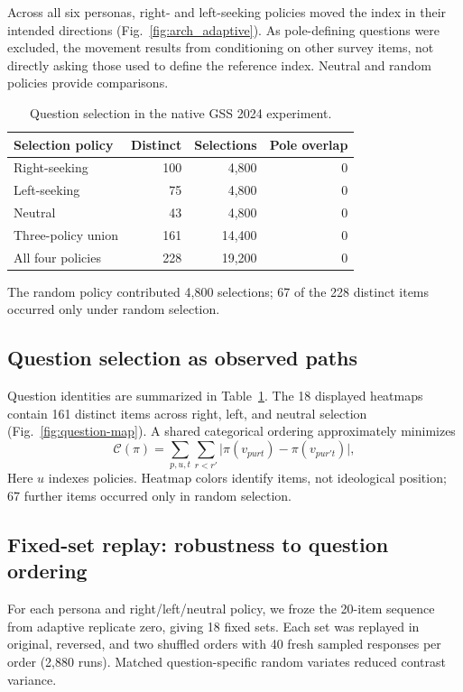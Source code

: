 \documentclass[technote,10pt]{IEEEtran}
\begin{document}
Across all six personas, right- and left-seeking policies moved the index in their intended directions (Fig.~\ref{fig:arch_adaptive}). As pole-defining questions were excluded, the movement results from conditioning on other survey items, not directly asking those used to define the reference index. Neutral and random policies provide comparisons.

\begin{table}[!t]
\centering
\caption{Question selection in the native GSS 2024 experiment.}
\label{tab:question-coverage}
\begingroup
\footnotesize
\setlength{\tabcolsep}{4pt}
\renewcommand{\arraystretch}{1.08}
\begin{tabular}{@{}lrrr@{}}
\toprule
\textbf{Selection policy} & \textbf{Distinct} & \textbf{Selections} & \textbf{Pole overlap}\\
\midrule
Right-seeking & 100 & 4,800 & 0\\
Left-seeking & 75 & 4,800 & 0\\
Neutral & 43 & 4,800 & 0\\
\midrule
Three-policy union & 161 & 14,400 & 0\\
All four policies & 228 & 19,200 & 0\\
\bottomrule
\end{tabular}
\endgroup
\par\smallskip
{\footnotesize\raggedright The random policy contributed 4,800 selections; 67 of the 228 distinct items occurred only under random selection.\par}
\end{table}

\subsection{Question selection as observed paths}
Question identities are summarized in Table~\ref{tab:question-coverage}. The 18 displayed heatmaps contain 161 distinct items across right, left, and neutral selection (Fig.~\ref{fig:question-map}). A shared categorical ordering approximately minimizes
\begin{equation}
\mathcal C(\pi)=\sum_{p,u,t}\sum_{r<r'}
\big|\pi(v_{purt})-\pi(v_{pur't})\big|,
\label{eq:question-seriation}
\end{equation}
Here $u$ indexes policies. Heatmap colors identify items, not ideological position; 67 further items occurred only in random selection.



\subsection{Fixed-set replay: robustness to question ordering}
For each persona and right/left/neutral policy, we froze the 20-item sequence from adaptive replicate zero, giving 18 fixed sets. Each set was replayed in original, reversed, and two shuffled orders with 40 fresh sampled responses per order (2,880 runs). Matched question-specific random variates reduced contrast variance.
\end{document}
